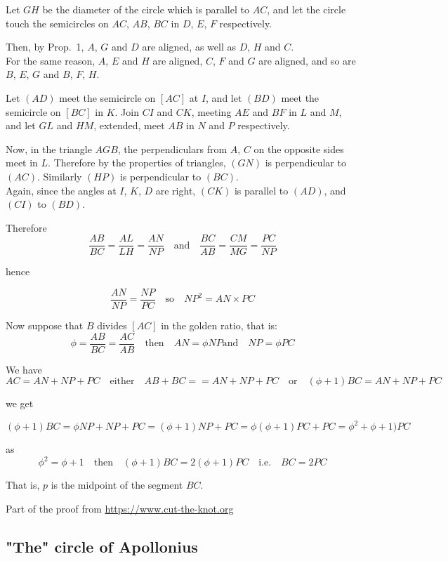 Let $GH$ be the diameter of the circle which is parallel to $AC$, and let the circle touch the semicircles on $AC$, $AB$, $BC$ in $D$, $E$, $F$ respectively.

Then, by Prop.~1, $A$, $G$ and $D$ are aligned, as well as $D$, $H$ and $C$.\\
 For the same reason, $A$, $E$ and $H$ are aligned, $C$, $F$ and $G$ are aligned, and so are $B$, $E$, $G$ and $B$, $F$, $H$.
 
Let $(AD)$ meet the semicircle on $[AC]$ at $I$, and let $(BD)$ meet the semicircle on $[BC]$ in $K$. Join $CI$ and $CK$, meeting $AE$ and $BF$ in $L$ and $M$, and let $GL$ and $HM$, extended, meet $AB$ in $N$ and $P$ respectively.

Now, in the triangle $AGB$, the perpendiculars from $A$, $C$ on the opposite sides meet in $L$. Therefore by the properties of triangles, $(GN)$ is perpendicular to $(AC)$.
Similarly $(HP)$ is perpendicular to $(BC)$.\\
Again, since the angles at $I$, $K$, $D$ are right, $(CK)$ is parallel to $(AD)$, and $(CI)$ to $(BD)$.

 Therefore\\
\[\frac{AB}{BC} = \frac{AL}{LH}    =  \frac{AN}{NP}  \quad\text{and} \quad \frac{BC}{AB} = \frac{CM}{MG}    =  \frac{PC}{NP} \]

hence

\[ \frac{AN}{NP}    =  \frac{NP}{PC} \quad\text{so} \quad {NP}^2 = AN \times PC  \]

Now suppose that $B$ divides $[AC]$ in the golden ratio, that is:
\[\phi = \frac{AB}{BC} =  \frac{AC}{AB} \quad\text{then}  \quad AN = \phi NP \text{and}\quad  NP = \phi PC \]

We have 
\[ AC = AN + NP + PC\quad \text{either} \quad AB + BC = = AN + NP + PC \quad \text{or} \quad (\phi + 1) BC = AN + NP + PC \]

we get 

\[ (\phi + 1) BC = \phi NP + NP + PC =(\phi + 1)NP + PC = \phi(\phi + 1)PC + PC = {\phi}^2 + \phi + 1)PC \]

as 
\[ {\phi}^2 = \phi + 1 \quad \text{then} \quad (\phi + 1) BC = 2(\phi + 1) PC \quad\text{i.e.}\quad BC = 2 PC \]

That is,
$p$ is the midpoint of the segment $BC$.

Part of the proof from \url{https://www.cut-the-knot.org}


\subsection{"The" circle of Apollonius}

